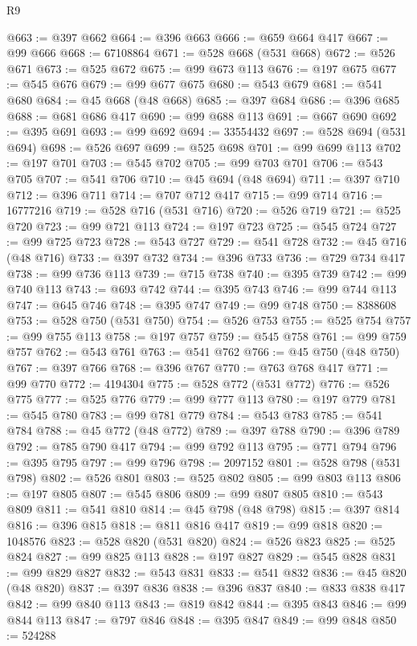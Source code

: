 \begin{lexlean}{R9}
\begin{coremodule}
@663 := @397 @662
@664 := @396 @663
@666 := @659 @664 @417
@667 := @99 @666
@668 := 67108864
@671 := @528 @668 (@531 @668)
@672 := @526 @671
@673 := @525 @672
@675 := @99 @673 @113
@676 := @197 @675
@677 := @545 @676
@679 := @99 @677 @675
@680 := @543 @679
@681 := @541 @680
@684 := @45 @668 (@48 @668)
@685 := @397 @684
@686 := @396 @685
@688 := @681 @686 @417
@690 := @99 @688 @113
@691 := @667 @690
@692 := @395 @691
@693 := @99 @692
@694 := 33554432
@697 := @528 @694 (@531 @694)
@698 := @526 @697
@699 := @525 @698
@701 := @99 @699 @113
@702 := @197 @701
@703 := @545 @702
@705 := @99 @703 @701
@706 := @543 @705
@707 := @541 @706
@710 := @45 @694 (@48 @694)
@711 := @397 @710
@712 := @396 @711
@714 := @707 @712 @417
@715 := @99 @714
@716 := 16777216
@719 := @528 @716 (@531 @716)
@720 := @526 @719
@721 := @525 @720
@723 := @99 @721 @113
@724 := @197 @723
@725 := @545 @724
@727 := @99 @725 @723
@728 := @543 @727
@729 := @541 @728
@732 := @45 @716 (@48 @716)
@733 := @397 @732
@734 := @396 @733
@736 := @729 @734 @417
@738 := @99 @736 @113
@739 := @715 @738
@740 := @395 @739
@742 := @99 @740 @113
@743 := @693 @742
@744 := @395 @743
@746 := @99 @744 @113
@747 := @645 @746
@748 := @395 @747
@749 := @99 @748
@750 := 8388608
@753 := @528 @750 (@531 @750)
@754 := @526 @753
@755 := @525 @754
@757 := @99 @755 @113
@758 := @197 @757
@759 := @545 @758
@761 := @99 @759 @757
@762 := @543 @761
@763 := @541 @762
@766 := @45 @750 (@48 @750)
@767 := @397 @766
@768 := @396 @767
@770 := @763 @768 @417
@771 := @99 @770
@772 := 4194304
@775 := @528 @772 (@531 @772)
@776 := @526 @775
@777 := @525 @776
@779 := @99 @777 @113
@780 := @197 @779
@781 := @545 @780
@783 := @99 @781 @779
@784 := @543 @783
@785 := @541 @784
@788 := @45 @772 (@48 @772)
@789 := @397 @788
@790 := @396 @789
@792 := @785 @790 @417
@794 := @99 @792 @113
@795 := @771 @794
@796 := @395 @795
@797 := @99 @796
@798 := 2097152
@801 := @528 @798 (@531 @798)
@802 := @526 @801
@803 := @525 @802
@805 := @99 @803 @113
@806 := @197 @805
@807 := @545 @806
@809 := @99 @807 @805
@810 := @543 @809
@811 := @541 @810
@814 := @45 @798 (@48 @798)
@815 := @397 @814
@816 := @396 @815
@818 := @811 @816 @417
@819 := @99 @818
@820 := 1048576
@823 := @528 @820 (@531 @820)
@824 := @526 @823
@825 := @525 @824
@827 := @99 @825 @113
@828 := @197 @827
@829 := @545 @828
@831 := @99 @829 @827
@832 := @543 @831
@833 := @541 @832
@836 := @45 @820 (@48 @820)
@837 := @397 @836
@838 := @396 @837
@840 := @833 @838 @417
@842 := @99 @840 @113
@843 := @819 @842
@844 := @395 @843
@846 := @99 @844 @113
@847 := @797 @846
@848 := @395 @847
@849 := @99 @848
@850 := 524288

\end{coremodule}
\end{lexlean}
